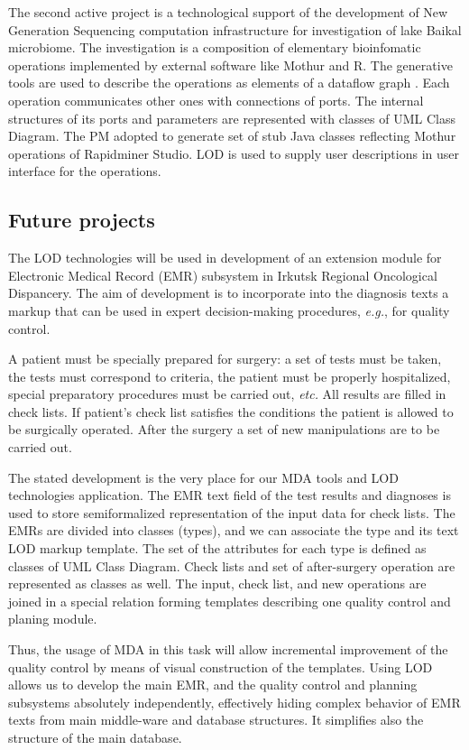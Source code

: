 \documentclass[conference,a4paper]{IEEEtran}
\begin{document}
The second active project is a technological support of the development of New Generation Sequencing computation infrastructure for investigation of lake Baikal microbiome.  The investigation is a composition of elementary bioinfomatic operations implemented by external software like Mothur and R.  The generative tools are used to describe the operations as elements of a dataflow graph \cite{dataflow}.  Each operation communicates other ones with connections of ports.  The internal structures of its ports and parameters are represented with classes of UML Class Diagram.  The PM adopted to generate set of stub Java classes reflecting Mothur operations of Rapidminer Studio.  LOD is used to supply user descriptions in user interface for the operations.

\subsection{Future projects}
\label{sec:futuretargets}

The LOD technologies will be used in development of an extension module for Electronic Medical Record (EMR) subsystem in Irkutsk Regional Oncological Dispancery.  The aim of development is to incorporate into the diagnosis texts a markup that can be used in expert decision-making procedures, \emph{e.g.}, for quality control.

A patient must be specially prepared for surgery: a set of tests must be taken, the tests must correspond to criteria, the patient must be properly hospitalized, special preparatory procedures must be carried out, \emph{etc.}  All results are filled in check lists.   If patient's check list satisfies the conditions the patient is allowed to be surgically operated.  After the surgery a set of new manipulations are to be carried out.

The stated development is the very place for our MDA tools and LOD technologies application.  The EMR text field of the test results and diagnoses is used to store semiformalized representation of the input data for check lists.  The EMRs are divided into classes (types), and we can associate the type and its text LOD markup template.  The set of the attributes for each type is defined as classes of UML Class Diagram.  Check lists and set of after-surgery operation are represented as classes as well.  The input, check list, and new operations are joined in a special relation forming templates describing one quality control and planing module.

Thus, the usage of MDA in this task will allow incremental improvement of the quality control by means of visual construction of the templates.  Using LOD allows us to develop the main EMR, and the quality control and planning subsystems absolutely independently, effectively hiding complex behavior of EMR texts from main middle-ware and database structures.  It simplifies also the structure of the main database.
\end{document}
